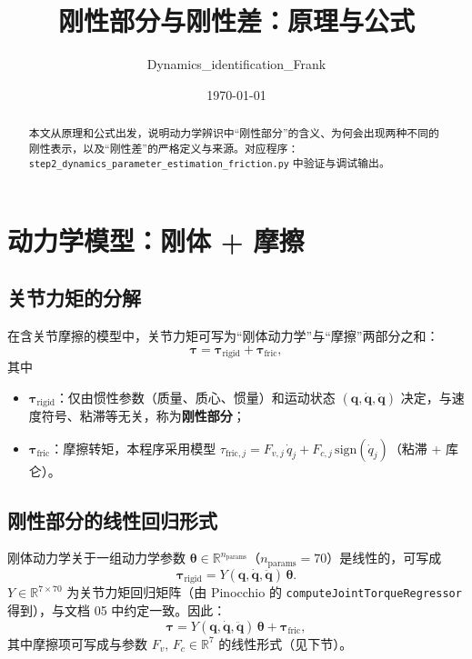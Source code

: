 \documentclass[12pt,a4paper]{article}
\title{刚性部分与刚性差：原理与公式}
\author{Dynamics\_identification\_Frank}
\date{\today}
\begin{document}
\maketitle

\begin{abstract}
本文从原理和公式出发，说明动力学辨识中``刚性部分''的含义、为何会出现两种不同的刚性表示，以及``刚性差''的严格定义与来源。对应程序：\texttt{step2\_dynamics\_parameter\_estimation\_friction.py} 中验证与调试输出。
\end{abstract}

\tableofcontents
\newpage

\section{动力学模型：刚体 + 摩擦}

\subsection{关节力矩的分解}

在含关节摩擦的模型中，关节力矩可写为``刚体动力学''与``摩擦''两部分之和：
\begin{equation}
  \bm{\tau} = \bm{\tau}_{\mathrm{rigid}} + \bm{\tau}_{\mathrm{fric}},
  \label{eq:tau_split}
\end{equation}
其中
\begin{itemize}[leftmargin=*]
  \item $\bm{\tau}_{\mathrm{rigid}}$：仅由惯性参数（质量、质心、惯量）和运动状态 $(\bm{q},\dot{\bm{q}},\ddot{\bm{q}})$ 决定，与速度符号、粘滞等无关，称为\textbf{刚性部分}；
  \item $\bm{\tau}_{\mathrm{fric}}$：摩擦转矩，本程序采用模型 $\tau_{\mathrm{fric},j} = F_{v,j}\,\dot{q}_j + F_{c,j}\,\mathrm{sign}(\dot{q}_j)$（粘滞 + 库仑）。
\end{itemize}

\subsection{刚性部分的线性回归形式}

刚体动力学关于一组动力学参数 $\bm{\theta}\in\mathbb{R}^{n_{\mathrm{params}}}$（$n_{\mathrm{params}}=70$）是线性的，可写成
\begin{equation}
  \bm{\tau}_{\mathrm{rigid}} = Y(\bm{q},\dot{\bm{q}},\ddot{\bm{q}})\,\bm{\theta}.
  \label{eq:rigid_Y_theta}
\end{equation}
$Y\in\mathbb{R}^{7\times 70}$ 为关节力矩回归矩阵（由 Pinocchio 的 \texttt{computeJointTorqueRegressor} 得到），与文档 05 中约定一致。因此：
\begin{equation}
  \bm{\tau} = Y(\bm{q},\dot{\bm{q}},\ddot{\bm{q}})\,\bm{\theta} + \bm{\tau}_{\mathrm{fric}},
  \label{eq:tau_full}
\end{equation}
其中摩擦项可写成与参数 $F_v,\,F_c\in\mathbb{R}^7$ 的线性形式（见下节）。
\end{document}
